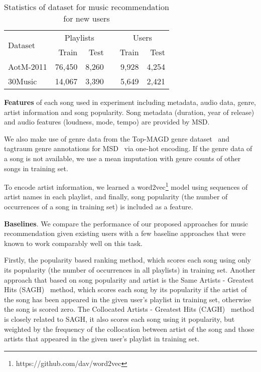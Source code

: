 \begin{table}[!h]
\centering
\caption{Statistics of dataset for music recommendation for new users}
\label{tab:stats_cold}
\begin{tabular}{lrrcrr}
\toprule
\multirow{2}{*}{Dataset}  & \multicolumn{2}{c}{Playlists} && \multicolumn{2}{c}{Users} \\ \cmidrule{2-3} \cmidrule{5-6}
                          & Train & Test && Train & Test \\
\midrule
AotM-2011 & 76,450 & 8,260 && 9,928 & 4,254 \\       
30Music   & 14,067 & 3,390 && 5,649 & 2,421 \\
\bottomrule
\end{tabular}
\end{table}


{\bf Features} of each song used in experiment including metadata, audio data, genre, artist information and song popularity.
Song metadata (\eg duration, year of release) and audio features (\eg loudness, mode, tempo) are provided by MSD.

We also make use of genre data from the Top-MAGD genre dataset~\cite{schindler2012facilitating} 
and tagtraum genre annotations for MSD~\cite{schreiber2015improving} via one-hot encoding.
If the genre data of a song is not available, we use a mean imputation with genre counts of other songs in training set.

To encode artist information, we learned a word2vec\footnote{https://github.com/dav/word2vec} model using sequences of artist names in each playlist,
and finally, song popularity (\ie the number of occurrences of a song in training set) is included as a feature.


{\bf Baselines}.
We compare the performance of our proposed approaches for music recommendation given existing users
with a few baseline approaches that were known to work comparably well on this task.

Firstly, the popularity based ranking method, which scores each song using only its popularity 
(the number of occurrences in all playlists) in training set.
%
Another approach that based on song popularity and artist is the Same Artists - Greatest Hits (SAGH)~\cite{mcfee2012million} method,
which scores each song by its popularity if the artist of the song has been appeared in the given user's playlist in training set, 
otherwise the song is scored zero.
%
The Collocated Artists - Greatest Hits (CAGH)~\cite{bonnin2013evaluating} method is closely related to SAGH,
it also scores each song using it popularity, but weighted by the frequency of the collocation between artist of the song 
and those artists that appeared in the given user's playlist in training set.


